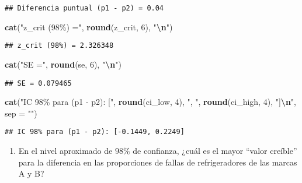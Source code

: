 \documentclass[
]{article}
\newenvironment{Shaded}{\begin{snugshade}}{\end{snugshade}}
\newcommand{\AttributeTok}[1]{\textcolor[rgb]{0.13,0.29,0.53}{#1}}
\newcommand{\DecValTok}[1]{\textcolor[rgb]{0.00,0.00,0.81}{#1}}
\newcommand{\FunctionTok}[1]{\textcolor[rgb]{0.13,0.29,0.53}{\textbf{#1}}}
\newcommand{\NormalTok}[1]{#1}
\newcommand{\SpecialCharTok}[1]{\textcolor[rgb]{0.81,0.36,0.00}{\textbf{#1}}}
\newcommand{\StringTok}[1]{\textcolor[rgb]{0.31,0.60,0.02}{#1}}
\providecommand{\tightlist}{%
  \setlength{\itemsep}{0pt}\setlength{\parskip}{0pt}}
\begin{document}
\begin{verbatim}
## Diferencia puntual (p1 - p2) = 0.04
\end{verbatim}

\begin{Shaded}
\begin{Highlighting}[]
\FunctionTok{cat}\NormalTok{(}\StringTok{"z\_crit (98\%) ="}\NormalTok{, }\FunctionTok{round}\NormalTok{(z\_crit, }\DecValTok{6}\NormalTok{), }\StringTok{"}\SpecialCharTok{\textbackslash{}n}\StringTok{"}\NormalTok{)}
\end{Highlighting}
\end{Shaded}

\begin{verbatim}
## z_crit (98%) = 2.326348
\end{verbatim}

\begin{Shaded}
\begin{Highlighting}[]
\FunctionTok{cat}\NormalTok{(}\StringTok{"SE ="}\NormalTok{, }\FunctionTok{round}\NormalTok{(se, }\DecValTok{6}\NormalTok{), }\StringTok{"}\SpecialCharTok{\textbackslash{}n}\StringTok{"}\NormalTok{)}
\end{Highlighting}
\end{Shaded}

\begin{verbatim}
## SE = 0.079465
\end{verbatim}

\begin{Shaded}
\begin{Highlighting}[]
\FunctionTok{cat}\NormalTok{(}\StringTok{"IC 98\% para (p1 {-} p2): ["}\NormalTok{, }\FunctionTok{round}\NormalTok{(ci\_low, }\DecValTok{4}\NormalTok{), }\StringTok{", "}\NormalTok{, }\FunctionTok{round}\NormalTok{(ci\_high, }\DecValTok{4}\NormalTok{), }\StringTok{"]}\SpecialCharTok{\textbackslash{}n}\StringTok{"}\NormalTok{, }\AttributeTok{sep =} \StringTok{""}\NormalTok{)}
\end{Highlighting}
\end{Shaded}

\begin{verbatim}
## IC 98% para (p1 - p2): [-0.1449, 0.2249]
\end{verbatim}

\begin{enumerate}
\def\labelenumi{\alph{enumi})}
\setcounter{enumi}{1}
\tightlist
\item
  En el nivel aproximado de \(98 \%\) de confianza, ¿cuál es el mayor
  ``valor creíble'' para la diferencia en las proporciones de fallas de
  refrigeradores de las marcas A y B?
\end{enumerate}
\end{document}
